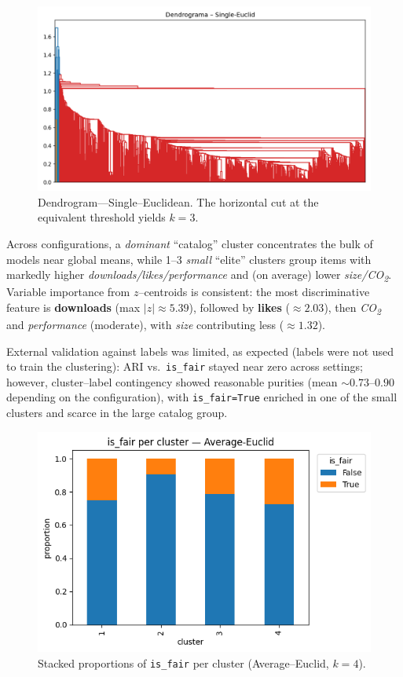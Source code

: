 \documentclass[journal]{IEEEtran}
\begin{document}
\begin{figure}[H]
	\centering
	\includegraphics[width=0.8\columnwidth]{assets/4_dendogram_single.png}
	\caption{Dendrogram—Single–Euclidean. The horizontal cut at the equivalent threshold yields $k=3$.}
	\label{fig:dendro_single_euclid}
\end{figure}

Across configurations, a \emph{dominant} “catalog” cluster concentrates the bulk of models near global means, while
1–3 \emph{small} “elite” clusters group items with markedly higher \emph{downloads/likes/performance} and (on average)
lower \emph{size/CO\textsubscript{2}}. Variable importance from $z$–centroids is consistent: the most discriminative
feature is \textbf{downloads} (max $|z|\approx 5.39$), followed by \textbf{likes} ($\approx 2.03$), then
\emph{CO\textsubscript{2}} and \emph{performance} (moderate), with \emph{size} contributing less ($\approx 1.32$).

External validation against labels was limited, as expected (labels were not used to train the clustering):
ARI vs.\ \texttt{is\_fair} stayed near zero across settings; however, cluster–label contingency showed reasonable
purities (mean $\sim 0.73$–$0.90$ depending on the configuration), with \texttt{is\_fair=True} enriched in one of the small
clusters and scarce in the large catalog group.

\begin{figure}[H]
	\centering
	\includegraphics[width=0.8\columnwidth]{assets/3_is_fair_per_cluster.png}
	\caption{Stacked proportions of \texttt{is\_fair} per cluster (Average–Euclid, $k=4$).}
	\label{fig:isfair_stacked}
\end{figure}
\end{document}
